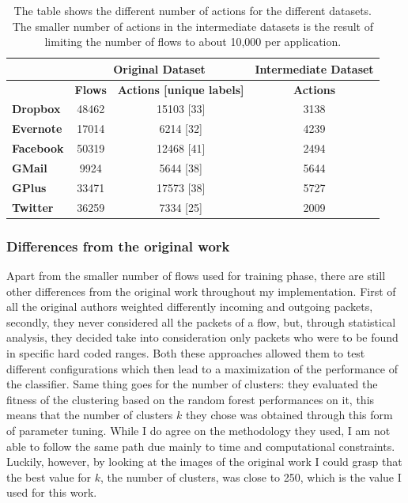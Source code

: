 \begin{table}[!h]
\centering
\begin{tabular}{|l|c|c|c|}
\hline
      & \multicolumn{2}{c|}{Original Dataset} & Intermediate Dataset \\ \hline
         & \textbf{Flows}    & \textbf{Actions [unique labels]}    & \textbf{Actions}              \\ \hline
\textbf{Dropbox}  & 48462    & 15103 [33]                 & 3138                 \\ \hline
\textbf{Evernote} & 17014    & 6214 [32]                  & 4239                 \\ \hline
\textbf{Facebook} & 50319    & 12468 [41]                 & 2494                 \\ \hline
\textbf{GMail}    & 9924     & 5644 [38]                  & 5644                 \\ \hline
\textbf{GPlus}    & 33471    & 17573 [38]                 & 5727                 \\ \hline
\textbf{Twitter}  & 36259    & 7334 [25]                  & 2009                 \\ \hline
\end{tabular}
\caption{\small{The table shows the different number of actions for the different datasets. The smaller number of actions in the intermediate datasets is the result of limiting the number of flows to about 10,000 per application.}}
\label{tab:datasetdata}
\end{table}


\subsubsection{Differences from the original work}
Apart from the smaller number of flows used for training phase, there are still other differences from the original work throughout my implementation. First of all the original authors weighted differently incoming and outgoing packets, secondly, they never considered all the packets of a flow, but, through statistical analysis, they decided take into consideration only packets who were to be found in specific hard coded ranges. Both these approaches allowed them to test different configurations which then lead to a maximization of the performance of the classifier. Same thing goes for the number of clusters: they evaluated the fitness of the clustering based on the random forest performances on it, this means that the number of clusters $k$ they chose was obtained through this form of parameter tuning. While I do agree on the methodology they used, I am not able to follow the same path due mainly to time and computational constraints. Luckily, however, by looking at the images of the original work I could grasp that the best value for $k$, the number of clusters, was close to 250, which is the value I used for this work.  

